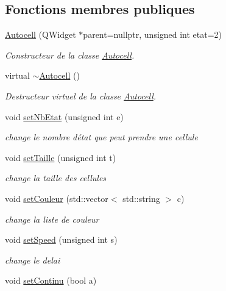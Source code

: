 \subsection*{Fonctions membres publiques}
\begin{DoxyCompactItemize}
\item 
\hyperlink{class_autocell_a43f55284a9ec07e5d0619a87391d7cc7}{Autocell} (Q\+Widget $\ast$parent=nullptr, unsigned int etat=2)
\begin{DoxyCompactList}\small\item\em Constructeur de la classe \hyperlink{class_autocell}{Autocell}. \end{DoxyCompactList}\item 
virtual \hyperlink{class_autocell_acdb5335402dda348cc1e0a62e47418fe}{$\sim$\+Autocell} ()
\begin{DoxyCompactList}\small\item\em Destructeur virtuel de la classe \hyperlink{class_autocell}{Autocell}. \end{DoxyCompactList}\item 
void \hyperlink{class_autocell_a62154f66156d8abbde2dab84cc2b6b5d}{set\+Nb\+Etat} (unsigned int e)
\begin{DoxyCompactList}\small\item\em change le nombre d\textquotesingle{}état que peut prendre une cellule \end{DoxyCompactList}\item 
void \hyperlink{class_autocell_a8e1fab78b4369eceedad58ddee63ae78}{set\+Taille} (unsigned int t)
\begin{DoxyCompactList}\small\item\em change la taille des cellules \end{DoxyCompactList}\item 
void \hyperlink{class_autocell_ac1dd89aa8d881471b06802b2d780474a}{set\+Couleur} (std\+::vector$<$ std\+::string $>$ c)
\begin{DoxyCompactList}\small\item\em change la liste de couleur \end{DoxyCompactList}\item 
void \hyperlink{class_autocell_a5f449aec7927c7225ff22857d92e970d}{set\+Speed} (unsigned int s)
\begin{DoxyCompactList}\small\item\em change le delai \end{DoxyCompactList}\item 
void \hyperlink{class_autocell_af8ec313790f53cf4a3abbc688c2b307d}{set\+Continu} (bool a)

\end{DoxyCompactItemize}
